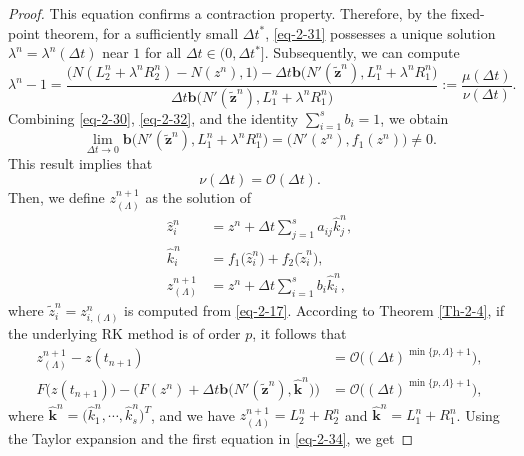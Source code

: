 \documentclass[onefignum,onetabnum]{siamart}
\begin{document}
\begin{proof}
This equation confirms a contraction property. Therefore, by the fixed-point theorem, for a sufficiently small $\Delta t^*$, \eqref{eq-2-31} possesses a unique solution $\lambda^n=\lambda^n(\Delta t)$ near $1$ for all $\Delta t\in(0,\Delta t^*]$. Subsequently, we can compute
\begin{equation}\label{eq-2-33}
	\lambda^n-1=\frac{\big(N(L_2^n+\lambda^nR_2^n)-N(z^n),1\big)-\Delta t\textbf{b}\big(N'(\tilde{\textbf{z}}^n),L_1^n+\lambda^nR_1^n\big)}{\Delta t\textbf{b}\big(N'(\tilde{\textbf{z}}^n),L_1^n+\lambda^nR_1^n\big)}:=\frac{\mu(\Delta t)}{\nu(\Delta t)}.
\end{equation}
Combining \eqref{eq-2-30}, \eqref{eq-2-32}, and the identity $\sum_{i=1}^s b_i = 1$, we obtain
\begin{equation*}
	\lim_{\Delta t\rightarrow 0}\textbf{b}\big(N'(\tilde{\textbf{z}}^n),L_1^n+\lambda^nR_1^n\big)=\big(N'(z^n),f_1(z^n)\big)\neq0.
\end{equation*}	
This result implies that
\begin{equation*}
	\nu(\Delta t)=\mathcal{O}(\Delta t).
\end{equation*}
Then, we define $z_{(\Lambda)}^{n+1}$ as the solution of
\begin{equation*}
	\begin{aligned}
		\hat{z}_i^n&=z^n+\Delta t\sum_{j=1}^sa_{ij}\hat{k}_j^n,\\
		\hat{k}_i^n&=f_1\big(\hat{z}_i^n\big)+f_2\big(\tilde{z}_i^n\big),\\
		z_{(\Lambda)}^{n+1}&=z^n+\Delta t\sum_{i=1}^sb_i\hat{k}_i^n,
	\end{aligned}
\end{equation*}
where $\tilde{z}_i^n=z_{i,(\Lambda)}^n$ is computed from \eqref{eq-2-17}. According to Theorem \ref{Th-2-4}, if the underlying RK method is of order $p$, it follows that
\begin{equation}\label{eq-2-34}
	\begin{aligned}
		z_{(\Lambda)}^{n+1}-z(t_{n+1})&=\mathcal{O}\big((\Delta t)^{\min\{p,\Lambda\}+1}\big),\\
		F\big(z(t_{n+1})\big)-\big(F(z^n)+\Delta t\textbf{b}\big(N'(\tilde{\textbf{z}}^n),\hat{\textbf{k}}^n\big)\big)&=\mathcal{O}\big((\Delta t)^{\min\{p,\Lambda\}+1}\big),
    \end{aligned}
\end{equation}	
where $\hat{\textbf{k}}^n=\big(\hat{k}_1^n,\cdots,\hat{k}_s^n\big)^T$, and we have $z_{(\Lambda)}^{n+1}=L_2^n+R_2^n$ and $\hat{\textbf{k}}^n=L_1^n+R_1^n$. Using the Taylor expansion and the first equation in \eqref{eq-2-34}, we get

\end{proof}
\end{document}
